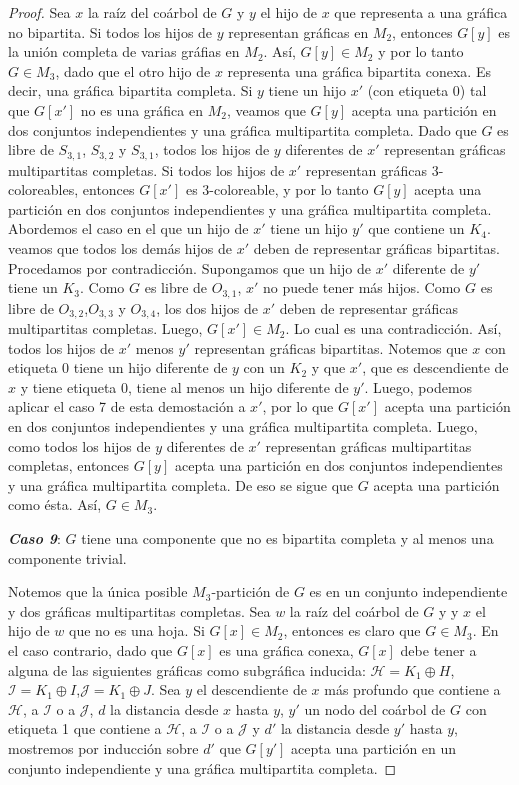 \begin{proof}
Sea $x$ la raíz del coárbol de $G$ y $y$ el hijo de $x$ que representa a una gráfica no bipartita. Si todos los hijos de $y$ representan gráficas en $M_2$, entonces $G[y]$ es la unión completa de varias gráfias en $M_2$. Así, $G[y]\in M_2$ y por lo tanto $G\in M_3$, dado que el otro hijo de $x$ representa una gráfica bipartita conexa. Es decir, una gráfica bipartita completa. Si $y$ tiene un hijo $x'$ (con etiqueta 0) tal que $G[x']$ no es una gráfica en $M_2$, veamos que $G[y]$ acepta una partición en dos conjuntos independientes y una gráfica multipartita completa. Dado que $G$ es libre de $S_{3,1}$, $S_{3,2}$ y $S_{3,1}$, todos los hijos de $y$ diferentes de $x'$ representan gráficas multipartitas completas. Si todos los hijos de $x'$ representan gráficas 3-coloreables, entonces $G[x']$ es 3-coloreable, y por lo tanto $G[y]$ acepta una partición en dos conjuntos independientes y una gráfica multipartita completa. Abordemos el caso en el que un hijo de $x'$ tiene un hijo $y'$ que contiene un $K_4$. veamos que todos los demás hijos de $x'$ deben de representar gráficas bipartitas. Procedamos por contradicción. Supongamos que un hijo de $x'$ diferente de $y'$ tiene un $K_3$. Como $G$ es libre de $O_{3,1}$, $x'$ no puede tener más hijos. Como $G$ es libre de  $O_{3,2}$,$O_{3,3}$ y $O_{3,4}$, los dos hijos de $x'$ deben de representar gráficas multipartitas completas. Luego, $G[x']\in M_2$. Lo cual es una contradicción. Así, todos los hijos de $x'$ menos $y'$ representan gráficas bipartitas. Notemos que $x$ con etiqueta 0 tiene un hijo diferente de $y$ con un $K_2$ y que $x'$, que es descendiente de $x$ y tiene etiqueta 0, tiene al menos un hijo diferente de $y'$. Luego, podemos aplicar el caso 7 de esta demostación a $x'$, por lo que $G[x']$ acepta una partición en dos conjuntos independientes y una gráfica multipartita completa. Luego, como todos los hijos de $y$ diferentes de $x'$ representan gráficas multipartitas completas, entonces $G[y]$ acepta una partición en dos conjuntos independientes y una gráfica multipartita completa. De eso se sigue que $G$ acepta una partición como ésta. Así, $G\in M_3$. 

\emph{\textbf{Caso 9}}: $G$ tiene una componente que no es bipartita completa y al menos una componente trivial.

Notemos que la única posible $M_3$-partición de $G$ es en un conjunto independiente y dos gráficas multipartitas completas. Sea $w$ la raíz del coárbol de $G$ y y $x$ el hijo de $w$ que no es una hoja. Si $G[x]\in M_2$, entonces es claro que $G\in M_3$. En el caso contrario, dado que $G[x]$ es una gráfica conexa, $G[x]$ debe tener a alguna de las siguientes gráficas como subgráfica inducida: $\mathcal{H}=K_1\oplus H$,$\mathcal{I}=K_1\oplus I$,$\mathcal{J}=K_1\oplus J$. Sea $y$ el descendiente de $x$ más profundo que contiene a $\mathcal{H}$, a $\mathcal{I}$ o a $\mathcal{J}$, $d$ la distancia desde $x$ hasta $y$, $y'$ un nodo del coárbol de $G$ con etiqueta 1 que contiene a $\mathcal{H}$, a $\mathcal{I}$ o a $\mathcal{J}$ y $d'$ la distancia desde $y'$ hasta $y$, mostremos por inducción sobre $d'$ que $G[y']$ acepta una partición en un conjunto independiente y una gráfica multipartita completa.


\end{proof}
